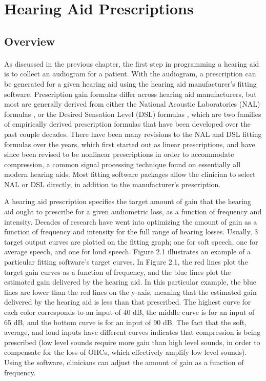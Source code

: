 \section{Hearing Aid Prescriptions}
\subsection{Overview}
\paragraph{}As discussed in the previous chapter, the first step in programming a hearing aid is to collect an audiogram for a patient.  With the audiogram, a prescription can be generated for a given hearing aid using the hearing aid manufacturer's fitting software.  Prescription gain formulas differ across hearing aid manufacturers, but most are generally derived from either the National Acoustic Laboratories (NAL) formulas \cite{Byrne1986, Byrne1990, Dillon1999, Keidser2011}, or the Desired Sensation Level (DSL) formulas \cite{Cornelisse1995, Scollie2005}, which are two families of empirically derived prescription formulas that have been developed over the past couple decades.  There have been many revisions to the NAL and DSL fitting formulas over the years, which first started out as linear prescriptions, and have since been revised to be nonlinear prescriptions in order to accommodate compression, a common signal processing technique found on essentially all modern hearing aids.  Most fitting software packages allow the clinician to select NAL or DSL directly, in addition to the manufacturer's prescription.

A hearing aid prescription specifies the target amount of gain that the hearing aid ought to prescribe for a given audiometric loss, as a function of frequency and intensity.  Decades of research have went into optimizing the amount of gain as a function of frequency and intensity for the full range of hearing losses.  Usually, 3 target output curves are plotted on the fitting graph; one for soft speech, one for average speech, and one for loud speech.  Figure 2.1 illustrates an example of a particular fitting software's target curves.  In Figure 2.1, the red lines plot the target gain curves as a function of frequency, and the blue lines plot the estimated gain delivered by the hearing aid.  In this particular example, the blue lines are lower than the red lines on the y-axis, meaning that the estimated gain delivered by the hearing aid is less than that prescribed.  The highest curve for each color corresponds to an input of 40 dB, the middle curve is for an input of 65 dB, and the bottom curve is for an input of 90 dB.  The fact that the soft, average, and loud inputs have different curves indicates that compression is being prescribed (low level sounds require more gain than high level sounds, in order to compensate for the loss of OHCs, which effectively amplify low level sounds).  Using the software, clinicians can adjust the amount of gain as a function of frequency.

